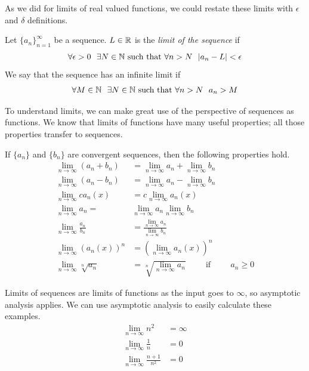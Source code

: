 \documentclass[fleqn]{report}
\begin{document}
As we did for limits of real valued functions, 
we could restate these limits with $\epsilon$ and $\delta$
definitions.

\begin{defn}
Let $\{a_n\}_{n=1}^\infty$ be a sequence. $L \in
\mathbb{R}$ is the \emph{limit of the sequence} if 
\begin{equation*}
\forall \epsilon > 0 \ \ \exists N \in \mathbb{N} \text{ such that }
\forall n > N \ \ |a_n - L| < \epsilon
\end{equation*}
We say that the sequence has an infinite limit if
\begin{equation*}
\forall M \in \mathbb{N} \ \ \exists N \in \mathbb{N} \text{ such that }
\forall n > N \ \ a_n > M
\end{equation*}
\end{defn}

To understand limits, we can make great use of the perspective
of sequences as functions. We know that limits of functions
have many useful properties; all those properties transfer to
sequences. 

\begin{prop}If $\{a_n\}$ and $\{b_n\}$ are convergent
sequences, then the following properties hold.
\begin{align*}
\lim_{n \rightarrow \infty} (a_n + b_n) & = \lim_{n
\rightarrow \infty} a_n + \lim_{n \rightarrow \infty} b_n \\
\lim_{n \rightarrow \infty} (a_n-b_n) & = \lim_{n \rightarrow
\infty} a_n - \lim_{n \rightarrow \infty} b_n \\
\lim_{n \rightarrow \infty} ca_n(x) & = c \lim_{n \rightarrow
\infty} a_n(x) \\
\lim_{n \rightarrow \infty} a_n =& \lim_{n \rightarrow
\infty} a_n \lim_{n \rightarrow \infty} b_n \\
\lim_{n \rightarrow \infty} \frac{a_n}{b_n} & = \frac{\lim_{n
\rightarrow \infty} a_n}{\lim_{n \rightarrow \infty} b_n} \\
\lim_{n \rightarrow \infty} (a_n(x))^n & = (\lim_{n
\rightarrow \infty} a_n(x))^n \\
\lim_{n \rightarrow \infty} \sqrt[n]{a_n} & = \sqrt[n]{\lim_{n
\rightarrow \infty} a_n} \hspace{1cm} \text{if} \hspace{1cm}
a_n \geq 0
\end{align*}
\end{prop}

\begin{example}Limits of sequences are limits of 
functions as the input goes to $\infty$, so asymptotic
analysis applies. We can use asymptotic analysis to easily
calculate these examples.
\begin{align*}
\lim_{n \rightarrow \infty} n^2 & = \infty \\
\lim_{n \rightarrow \infty} \frac{1}{n} & = 0 \\
\lim_{n \rightarrow \infty} \frac{n+1}{n^2} & = 0 
\end{align*}
\end{example}
\end{document}
